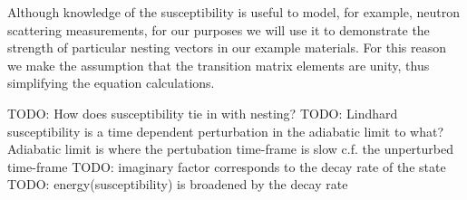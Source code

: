 Although knowledge of the susceptibility is useful to model, for example, neutron scattering measurements, for our purposes we will use it to demonstrate the strength of particular nesting vectors in our example materials. For this reason we make the assumption that the transition matrix elements are unity, thus simplifying the equation calculations.


TODO: How does susceptibility tie in with nesting?
TODO: Lindhard susceptibility is a time dependent perturbation in the adiabatic limit to what? Adiabatic limit is where the pertubation time-frame is slow c.f. the unperturbed time-frame 
TODO: imaginary factor corresponds to the decay rate of the state
TODO: energy(susceptibility) is broadened by the decay rate




